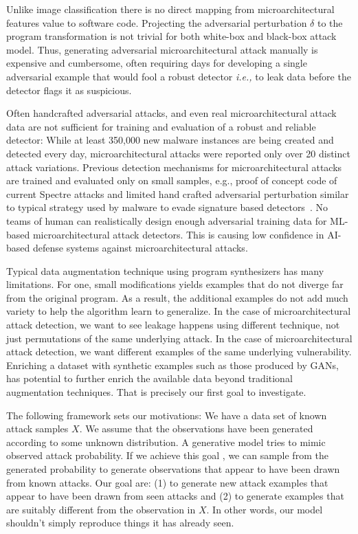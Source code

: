 Unlike image classification there is no direct mapping from microarchitectural features value to software code.   
Projecting the adversarial perturbation $\delta$ to the program transformation is not trivial for both white-box and black-box attack model. 
Thus, generating adversarial microarchitectural attack manually is  expensive and cumbersome, often requiring days for developing a single adversarial example that would fool a robust detector {\em i.e.,} to leak data before the detector flags it as suspicious. 

Often handcrafted adversarial attacks, and even real microarchitectural attack data are not sufficient for training and evaluation of a robust and reliable detector: While at least 350,000 new malware instances are being created and detected every day, microarchitectural attacks were reported only over 20 distinct attack variations. 
Previous detection mechanisms for microarchitectural attacks are trained and evaluated only on small samples, e.g., proof of concept code of current Spectre attacks and limited hand crafted adversarial perturbation similar to typical strategy 
used by malware to evade signature based 
detectors~\cite{PaulKocher,paulKocherSpectreAttacks}. No teams of human can realistically design enough adversarial training data for ML-based microarchitectural attack detectors.
This is causing low confidence in AI-based defense systems against microarchitectural attacks.

Typical data augmentation technique using program synthesizers has many limitations. For one, small modifications yields examples that do not diverge far from the original program. As a result, the additional examples do not add much variety to help the algorithm learn to generalize. In the case of microarchitectural attack detection, we want to see leakage happens using different technique, not just permutations of the same underlying attack.
In the case of microarchitectural attack detection, we want different examples of the same underlying vulnerability. Enriching a dataset with synthetic examples such as those produced by GANs, has potential to further enrich the available data beyond traditional augmentation techniques. That is precisely our first goal to investigate. 

 
 The following framework sets our motivations:
  We have a data set of known attack samples $X$. 
 We assume that the observations have been generated according to some unknown distribution. 
 A generative model tries to mimic observed attack probability. If we achieve this goal , we can sample from the generated probability to generate observations that appear to have been drawn from known attacks. Our goal are: (1) to generate new attack examples that appear to have been drawn from seen attacks and (2) to generate examples that are suitably different from the observation in $X$. In other words, our model shouldn't simply reproduce things it has already seen. 


